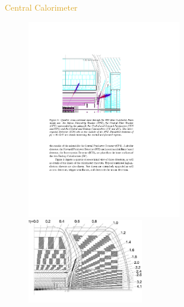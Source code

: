 \begin{frame}{\textcolor{Goldenrod}{Central Calorimeter}}
  \begin{overlayarea}{\textwidth}{\textheight}
    \begin{figure}[h]
      \centering
      \includegraphics[height=0.4\textheight, width=0.6\textwidth]{./Images/40_CAL_showers.pdf}
      \includegraphics[height=0.4\textheight, width=0.45\textwidth]{./Images/38_CAL_central.jpg}
      
    \end{figure}

    \itt[<only@+>]
    

\end{overlayarea}
\end{frame}

